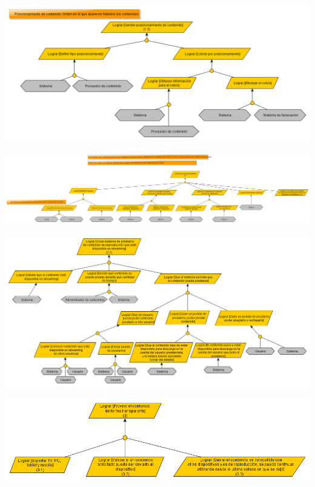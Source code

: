 \documentclass[11pt, a4paper, spanish]{article}
\begin{document}
\newpage
	\begin{center}
		\includegraphics[scale=0.65, angle=90]{Diagramas/1-5ModelodeObjetivosVenderposicionamiento.png}
	\end{center}
\newpage
	\begin{center}
		\includegraphics[scale=0.30, angle=90]{Diagramas/2ModelodeObjetivosPersonalizado.png}
	\end{center}
\newpage
	\begin{center}
		\includegraphics[scale=0.60, angle=90]{Diagramas/2-1ModelodeObjetivosPrestamocontenidos.png}
	\end{center}
\newpage
	\begin{center}
		\includegraphics[scale=0.65, angle=90]{Diagramas/3ModelodeObjetivosTransparente.png}
	\end{center}
\end{document}
